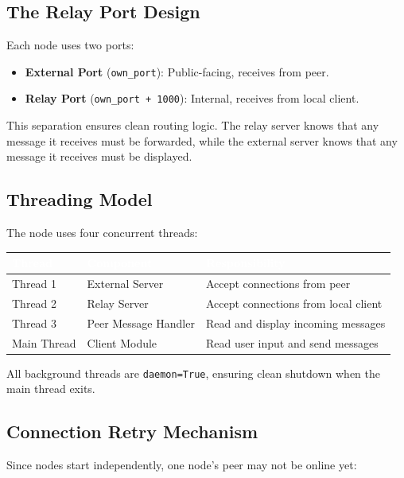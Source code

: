 \documentclass[11pt]{article}
\begin{document}
\subsection{The Relay Port Design}

Each node uses two ports:
\begin{itemize}
    \item \textbf{External Port} (\texttt{own\_port}): Public-facing, receives from peer.
    \item \textbf{Relay Port} (\texttt{own\_port + 1000}): Internal, receives from local client.
\end{itemize}

This separation ensures clean routing logic. The relay server knows that any message it receives must be forwarded, while the external server knows that any message it receives must be displayed.

\subsection{Threading Model}

The node uses four concurrent threads:

\begin{center}
\begin{tabular}{|l|l|l|}
\hline
\rowcolor{tableheader}
\textcolor{white}{\textbf{Thread}} & \textcolor{white}{\textbf{Component}} & \textcolor{white}{\textbf{Responsibility}} \\ \hline
Thread 1 & External Server & Accept connections from peer \\ \hline
Thread 2 & Relay Server & Accept connections from local client \\ \hline
Thread 3 & Peer Message Handler & Read and display incoming messages \\ \hline
Main Thread & Client Module & Read user input and send messages \\ \hline
\end{tabular}
\end{center}

All background threads are \texttt{daemon=True}, ensuring clean shutdown when the main thread exits.

\subsection{Connection Retry Mechanism}

Since nodes start independently, one node's peer may not be online yet:
\end{document}
